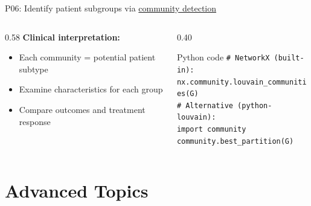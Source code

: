 \documentclass[aspectratio=169, 10pt]{beamer}
\begin{document}
\begin{frame}{P06: Identify patient subgroups via \href{https://en.wikipedia.org/wiki/Community_structure}{community detection}}
\begin{columns}[T]
\begin{column}{0.58\textwidth}
            \vspace{2mm}
            \textbf{Clinical interpretation:}
            \begin{itemize}\setlength{\itemsep}{0pt}
                \item Each community = potential patient subtype
                \item Examine characteristics for each group
                \item Compare outcomes and treatment response
            \end{itemize}
        \end{column}
        \begin{column}{0.40\textwidth}
            \begin{block}{\scriptsize Python code}
                \scriptsize
                \texttt{\# NetworkX (built-in):}\\
                \texttt{nx.community.louvain\_communities(G)}\\[3pt]
                \texttt{\# Alternative (python-louvain):}\\
                \texttt{import community}\\
                \texttt{community.best\_partition(G)}
            \end{block}
        \end{column}
    \end{columns}
\end{frame}

\section{Advanced Topics}
\end{document}
